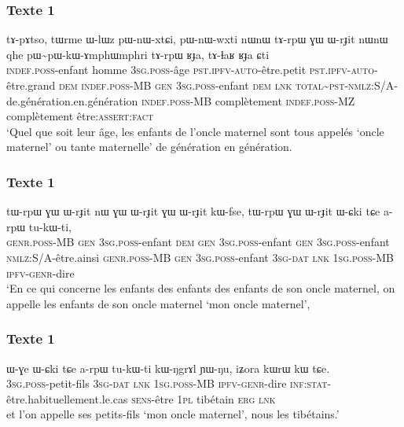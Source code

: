 \documentclass[xcolor=table]{beamer}
\newcommand{\tld}{\textasciitilde{}}
\newcommand{\ipa}[1]{{\phon #1}} %
\begin{document}
  \begin{frame} 
 \frametitle{Texte 1} 
\begin{exe}
\ex 
\gll 
\ipa{tɤ-pɤtso,} 	\ipa{tɯrme} 	\ipa{ɯ-lɯz} 	\ipa{pɯ-nɯ-xtɕi,} 	\ipa{pɯ-nɯ-wxti} 	\ipa{nɯnɯ} 	\ipa{tɤ-rpɯ} 	\ipa{ɣɯ} 	\ipa{ɯ-rɟit} 	\ipa{nɯnɯ} 	\ipa{qhe} 	\ipa{pɯ\tld{}pɯ-kɯ-ɤmphɯmphri} 	\ipa{tɤ-rpɯ} 	\ipa{ʁɟa,} 	\ipa{tɤ-ɬaʁ} 	\ipa{ʁɟa} 	\ipa{ɕti}   \\
 \textsc{indef.poss}-enfant homme  \textsc{3sg.poss}-âge \textsc{pst.ipfv-auto}-être.petit \textsc{pst.ipfv-auto}-être.grand \textsc{dem}    \textsc{indef.poss}-MB \textsc{gen} \textsc{3sg.poss}-enfant \textsc{dem} \textsc{lnk} \textsc{total\tld{}pst-nmlz:S/A}-de.génération.en.génération \textsc{indef.poss}-MB complètement \textsc{indef.poss}-MZ complètement être:\textsc{assert}:\textsc{fact} \\
\glt `Quel que soit leur âge, les enfants de l'oncle maternel sont tous appelés `oncle maternel' ou   tante maternelle' de génération en génération. 
\end{exe}
\end{frame}

  \begin{frame} 
 \frametitle{Texte 1} 
 \begin{exe}
\ex 
\gll 
\ipa{tɯ-rpɯ} 	\ipa{ɣɯ} 	\ipa{ɯ-rɟit} 	\ipa{nɯ} 	\ipa{ɣɯ} 	\ipa{ɯ-rɟit} 	\ipa{ɣɯ} 	\ipa{ɯ-rɟit} 	\ipa{kɯ-fse,}  \ipa{tɯ-rpɯ} 	\ipa{ɣɯ} 	\ipa{ɯ-rɟit} 	\ipa{ɯ-ɕki} 	\ipa{tɕe} 	\ipa{a-rpɯ} 	\ipa{tu-kɯ-ti,} \\
\textsc{genr.poss}-MB \textsc{gen} \textsc{3sg.poss}-enfant \textsc{dem} \textsc{gen} \textsc{3sg.poss}-enfant \textsc{gen} \textsc{3sg.poss}-enfant \textsc{nmlz}:S/A-être.ainsi \textsc{genr.poss}-MB  \textsc{gen} \textsc{3sg.poss}-enfant \textsc{3sg-dat} \textsc{lnk} \textsc{1sg.poss}-MB \textsc{ipfv-genr}-dire \\
\glt `En ce qui concerne les enfants des enfants des enfants de son oncle maternel, on appelle les enfants de son oncle maternel `mon oncle maternel',
\end{exe}
\end{frame}

  \begin{frame} 
 \frametitle{Texte 1} 
 \begin{exe}
\ex 
\gll 
\ipa{ɯ-ɣe} 	\ipa{ɯ-ɕki} 	\ipa{tɕe} 	\ipa{a-rpɯ} 	\ipa{tu-kɯ-ti} 	\ipa{kɯ-ŋgrɤl} 	\ipa{ɲɯ-ŋu,} \ipa{iʑora} 	\ipa{kɯrɯ} 	\ipa{kɯ} 	\ipa{tɕe.} \\
\textsc{3sg.poss}-petit-fils \textsc{3sg-dat} \textsc{lnk} \textsc{1sg.poss}-MB \textsc{ipfv-genr}-dire \textsc{inf:stat}-être.habituellement.le.cas \textsc{sens}-être \textsc{1pl} tibétain \textsc{erg} \textsc{lnk} \\
\glt et l'on appelle ses petits-fils `mon oncle maternel', nous les tibétains.'
\end{exe}
\end{frame}
\end{document}
